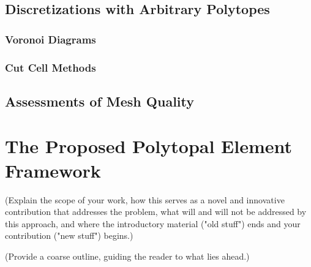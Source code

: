 \subsection{Discretizations with Arbitrary Polytopes}
\subsubsection{Voronoi Diagrams}
\subsubsection{Cut Cell Methods}

\subsection{Assessments of Mesh Quality}

\section{The Proposed Polytopal Element Framework}

(Explain the scope of your work, how this serves as a novel and innovative contribution that addresses the problem, what will and will not be addressed by this approach, and where the introductory material ("old stuff") ends and your contribution ("new stuff") begins.)

(Provide a coarse outline, guiding the reader to what lies ahead.)
